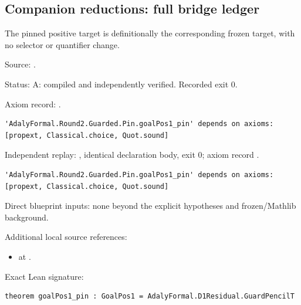 \subsection{Companion reductions: full bridge ledger}

\begin{theorem}[bp-243]
\label{bp-243}
\uses{}
\leanok
The pinned positive target is definitionally the corresponding frozen target, with no selector or quantifier change.

\par Source: \texttt{}.
\par Status: A: compiled and independently verified. Recorded exit 0.
\par Axiom record: \texttt{}.
\begin{verbatim}
'AdalyFormal.Round2.Guarded.Pin.goalPos1_pin' depends on axioms: [propext, Classical.choice, Quot.sound]
\end{verbatim}
\par Independent replay: \texttt{}, identical declaration body, exit 0; axiom record \texttt{}.
\begin{verbatim}
'AdalyFormal.Round2.Guarded.Pin.goalPos1_pin' depends on axioms: [propext, Classical.choice, Quot.sound]
\end{verbatim}
\par Direct blueprint inputs: none beyond the explicit hypotheses and frozen/Mathlib background.
\par Additional local source references:
\begin{itemize}
\item \texttt{} at \texttt{}.
\end{itemize}
\par Exact Lean signature:
\begin{verbatim}
theorem goalPos1_pin : GoalPos1 = AdalyFormal.D1Residual.GuardPencilT
\end{verbatim}
\end{theorem}

